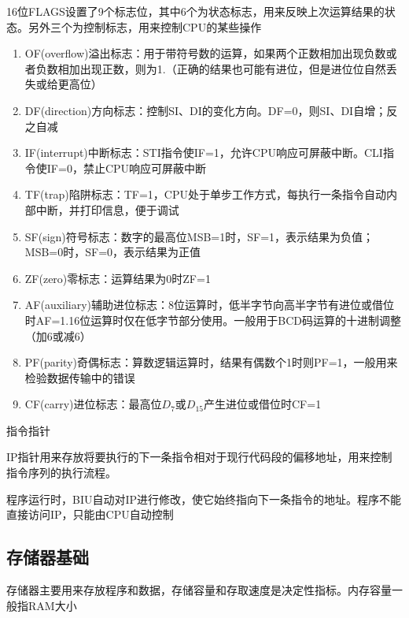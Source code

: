 16位FLAGS设置了9个标志位，其中6个为状态标志，用来反映上次运算结果的状态。另外三个为控制标志，用来控制CPU的某些操作
\begin{enumerate}
    \item OF(overflow)溢出标志：用于带符号数的运算，如果两个正数相加出现负数或者负数相加出现正数，则为1.（正确的结果也可能有进位，但是进位位自然丢失或给更高位）
    \item DF(direction)方向标志：控制SI、DI的变化方向。DF=0，则SI、DI自增；反之自减
    \item IF(interrupt)中断标志：STI指令使IF=1，允许CPU响应可屏蔽中断。CLI指令使IF=0，禁止CPU响应可屏蔽中断
    \item TF(trap)陷阱标志：TF=1，CPU处于单步工作方式，每执行一条指令自动内部中断，并打印信息，便于调试
    \item SF(sign)符号标志：数字的最高位MSB=1时，SF=1，表示结果为负值；MSB=0时，SF=0，表示结果为正值
    \item ZF(zero)零标志：运算结果为0时ZF=1
    \item AF(auxiliary)辅助进位标志：8位运算时，低半字节向高半字节有进位或借位时AF=1.16位运算时仅在低字节部分使用。一般用于BCD码运算的十进制调整（加6或减6）
    \item PF(parity)奇偶标志：算数逻辑运算时，结果有偶数个1时则PF=1，一般用来检验数据传输中的错误
    \item CF(carry)进位标志：最高位$D_7$或$D_{15}$产生进位或借位时CF=1
\end{enumerate}
指令指针

IP指针用来存放将要执行的下一条指令相对于现行代码段的偏移地址，用来控制指令序列的执行流程。

程序运行时，BIU自动对IP进行修改，使它始终指向下一条指令的地址。程序不能直接访问IP，只能由CPU自动控制
\subsection{存储器基础}
存储器主要用来存放程序和数据，存储容量和存取速度是决定性指标。内存容量一般指RAM大小

